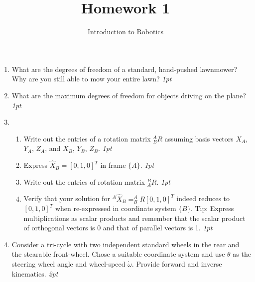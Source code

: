 \documentclass[letter,twoside,11pt]{article}
\begin{document}
\title{Homework 1}
\author{Introduction to Robotics}
\maketitle

\begin{enumerate}
\item What are the degrees of freedom of a standard, hand-pushed lawnmower? Why are you still able to mow your entire lawn? \emph{1pt}
\item What are the maximum degrees of freedom for objects driving on the plane? \emph{1pt}
\item 
\begin{enumerate}
 \item Write out the entries of a rotation matrix $^A_BR$ assuming basis vectors $X_A$, $Y_A$, $Z_A$, and $X_B$, $Y_B$, $Z_B$. \emph{1pt}
 \item Express $\hat{X}_B=[0, 1, 0]^T$ in frame $\{A\}$. \emph{1pt}
 \item Write out the entries of rotation matrix $^B_AR$. \emph{1pt}
 \item Verify that your solution for $^A\hat{X}_B=^A_BR[0, 1, 0]^T$ indeed reduces to $[0, 1, 0]^T$ when re-expressed in coordinate system $\{B\}$.  Tip: Express multiplications as scalar products and remember that the scalar product of orthogonal vectors is 0 and that of parallel vectors is 1. \emph{1pt}
\end{enumerate} 
\item Consider a tri-cycle with two independent standard wheels in the rear and the stearable front-wheel. Chose a suitable coordinate system and use $\theta$ as the steering wheel angle and wheel-speed $\dot{\omega}$. Provide forward and inverse kinematics. \emph{2pt}

\end{enumerate}




\end{document}
